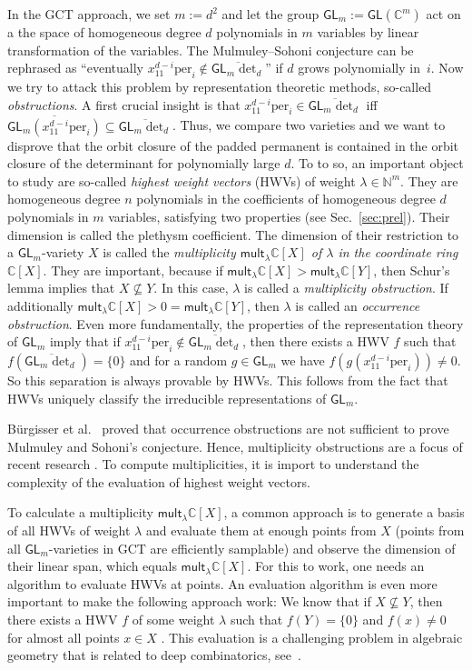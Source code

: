 \documentclass[10pt,a4paper]{article}
\numberwithin{equation}{section}
\theoremstyle{definition}
\newcommand{\GL}{\mathsf{GL}}
\newcommand{\mult}{\mathsf{mult}}
\newcommand{\IC}{\mathbb{C}}
\newcommand{\IN}{\mathbb{N}}
\newcommand{\la}{\lambda}
\newcommand{\per}{\text{per}}
\begin{document}
In the GCT approach, we set $m:=d^2$ and let the group $\GL_{m}:=\GL(\IC^m)$ act on a the space of homogeneous degree $d$ polynomials in $m$ variables by linear transformation of the variables. The Mulmuley--Sohoni conjecture can
be rephrased as ``eventually $x_{11}^{d-i} \per_i \notin \overline{\GL_m \det_d}$'' if $d$ grows polynomially in~$i$. Now we try to attack this problem by representation theoretic methods, so-called \emph{obstructions}.
A first crucial insight is that $x_{11}^{d-i} \per_i \in \overline{\GL_m \det_d}$
iff
$\overline{\GL_m (x_{11}^{d-i} \per_i)} \subseteq \overline{\GL_m \det_d}$. Thus, we compare two varieties and we want to disprove that
the orbit closure of the padded permanent is contained in the orbit 
closure of the determinant for polynomially large $d$.
To to so, an important object to study are so-called \emph{highest weight vectors} (HWVs) of weight $\la \in \IN^m$.
They are homogeneous degree $n$ polynomials in the coefficients of homogeneous degree $d$ polynomials in $m$ variables, satisfying two properties (see Sec.~\ref{sec:prel}). Their dimension is called the plethysm coefficient. The dimension of their restriction to a $\GL_m$-variety $X$ is called the \emph{multiplicity $\mult_\la \IC[X]$ of $\la$ in the coordinate ring $\IC[X]$}. They are important, because if $\mult_\la \IC[X] > \mult_\la \IC[Y]$, then Schur's lemma implies that $X \not\subseteq Y$. In this case, $\la$ is called a \emph{multiplicity obstruction}.
If additionally $\mult_\la \IC[X] > 0 = \mult_\la \IC[Y]$, then $\la$ is called an \emph{occurrence obstruction}.
Even more fundamentally, the properties of the representation theory of $\GL_m$ imply that if $x_{11}^{d-i} \per_i \notin \overline{\GL_m \det_d}$, then there exists a HWV $f$ such that
$f(\overline{\GL_m \det_d})=\{0\}$
and for a random $g \in \GL_m$ we have $f(g(x_{11}^{d-i} \per_i)) \neq 0$.
So this separation is always provable by HWVs.
This follows from the fact that HWVs uniquely classify the irreducible representations of $\GL_m$.

B\"urgisser et al.~\cite{BIP:19} proved that occurrence obstructions are not sufficient to prove Mulmuley and Sohoni's conjecture.
Hence, multiplicity obstructions are a focus of recent research \cite{DBLP:conf/icalp/DorflerIP19, IK:19}. To compute multiplicities,
it is import to understand the complexity of the evaluation of highest weight vectors.  

To calculate a multiplicity $\mult_\la \IC[X]$, a common approach is to generate a basis of all HWVs of weight $\la$ and evaluate them at enough points from $X$ (points from all $\GL_m$-varieties in GCT are efficiently samplable) and observe the dimension of their linear span, which equals $\mult_\la \IC[X]$. For this to work, one needs an algorithm to evaluate HWVs at points.
An evaluation algorithm is even more important to make the following approach work:
We know that if $X \not\subseteq Y$, then there exists a HWV $f$ of some weight $\la$ such that $f(Y)=\{0\}$ and $f(x) \neq 0$ for almost all points $x \in X$ \cite[Cor.~11.4.2]{BI:17}.
This evaluation is a challenging problem in algebraic geometry that is related to deep combinatorics, see~\cite{LK:15, cheung2017symmetrizing, AIR:16}.
\end{document}
